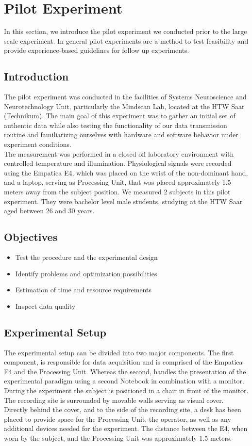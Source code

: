 \section{Pilot Experiment}
In this section, we introduce the pilot experiment we conducted prior to the large scale experiment. In general pilot experiments are a method to test feasibility and provide experience-based guidelines for follow up experiments. 
\subsection{Introduction}
The pilot experiment was conducted in the facilities of Systems Neuroscience and Neurotechnology Unit, particularly the Mindscan Lab, located at the HTW Saar (Technikum). The main goal of this experiment was to gather an initial set of authentic data while also testing the functionality of our data transmission routine and familiarizing ourselves with hardware and software behavior under experiment conditions. \\
The measurement was performed in a closed off laboratory environment with controlled temperature and illumination. Physiological signals were recorded using the Empatica E4, which was placed on the wrist of the non-dominant hand, and a laptop, serving as Processing Unit, that was placed approximately 1.5 meters away from the subject position.
We measured 2 subjects in this pilot experiment. They were bachelor level male students, studying at the HTW Saar aged between 26 and 30 years.

\subsection{Objectives}
\begin{itemize}
\item Test the procedure and the experimental design
\item Identify problems and optimization possibilities
\item Estimation of time and resource requirements
\item Inspect data quality
\end{itemize}
\subsection{Experimental Setup}
The experimental setup can be divided into two major components. The first component, is responsible for data acquisition and is comprised of the Empatica E4 and the Processing Unit. Whereas the second, handles the presentation of the experimental paradigm using a second Notebook in combination with a monitor.
During the experiment the subject is positioned in a chair in front of the monitor. The recording site is surrounded by movable walls serving as visual cover. Directly behind the cover, and to the side of the recording site, a desk has been placed to provide space for the Processing Unit, the operator, as well as any additional devices needed for the experiment. The distance between the E4, when worn by the subject, and the Processing Unit was approximately 1.5 meters.
